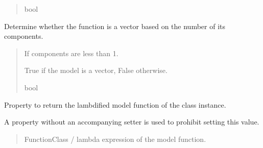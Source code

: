 \documentclass[letterpaper,10pt,english]{sphinxmanual}
\begin{document}
\begin{fulllineitems}
\begin{fulllineitems}
\begin{quote}
\begin{description}
\sphinxAtStartPar
bool

\end{description}\end{quote}

\end{fulllineitems}


\begin{fulllineitems}
\label{\detokenize{VPCModel:src.VPCModel.VPCModel.is_vector}}
\pysigstartsignatures
{}
\pysigstopsignatures
\sphinxAtStartPar
Determine whether the function is a vector based on the number of its components.
\begin{quote}\begin{description}
\sphinxAtStartPar
{} \textendash{} If components are less than 1.

\sphinxAtStartPar
True if the model is a vector, False otherwise.

\sphinxAtStartPar
bool

\end{description}\end{quote}

\end{fulllineitems}


\begin{fulllineitems}
\label{\detokenize{VPCModel:src.VPCModel.VPCModel.model_function}}
\pysigstartsignatures
{}
\pysigstopsignatures
\sphinxAtStartPar
Property to return the lambdified model function of the class instance.

\sphinxAtStartPar
A property without an accompanying setter is used to prohibit setting this value.
\begin{quote}\begin{description}
\sphinxAtStartPar
FunctionClass / lambda expression of the model function.


\end{description}
\end{quote}
\end{fulllineitems}
\end{fulllineitems}
\end{document}

